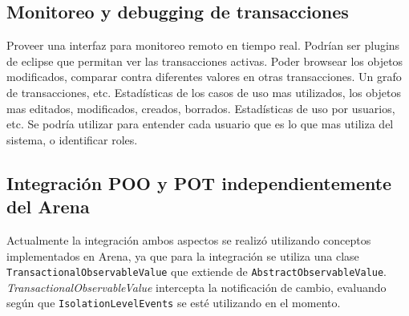 	\subsection{Monitoreo y debugging de transacciones}
		Proveer una interfaz para monitoreo remoto en tiempo real. Podrían ser plugins
		de eclipse que permitan ver las transacciones activas. 
		Poder browsear los objetos modificados, comparar contra diferentes valores en
		otras transacciones. Un grafo de transacciones, etc.
		Estadísticas de los casos de uso mas utilizados, los
		objetos mas editados, modificados, creados, borrados. 
		Estadísticas de uso por usuarios, etc. Se podría
		utilizar para entender cada usuario que es lo que mas
		utiliza del sistema, o identificar roles.

	
	\subsection{Integración POO y POT independientemente del Arena}
		Actualmente la integración ambos aspectos se realizó utilizando conceptos
		implementados en Arena, ya que para la integración se utiliza una clase
		\lstinline|TransactionalObservableValue| que extiende de
		\lstinline|AbstractObservableValue|. \emph{TransactionalObservableValue}
		intercepta la notificación de cambio, evaluando según que
		\lstinline|IsolationLevelEvents| se esté utilizando en el momento.
		 
